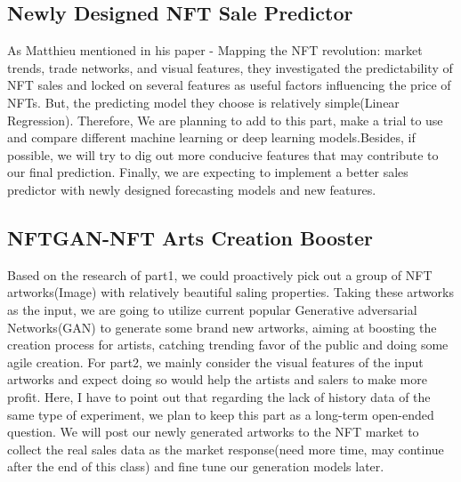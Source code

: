 \subsection{Newly Designed NFT Sale Predictor}
As Matthieu mentioned in his paper - Mapping the NFT revolution: market trends, trade networks, and visual features\cite{nadini2021mapping}, they investigated the predictability of NFT sales and locked on several features as useful factors influencing the price of NFTs. But, the predicting model they choose is relatively simple(Linear Regression). Therefore, We are planning to add to this part, make a trial to use and compare different machine learning or deep learning models.Besides, if possible, we will try to dig out more conducive features that may contribute to our final prediction. Finally, we are expecting to implement a better sales predictor with newly designed forecasting models and new features.

\subsection{NFTGAN-NFT Arts Creation Booster}
Based on the research of part1, we could proactively pick out a group of NFT artworks(Image) with relatively beautiful saling properties. Taking these artworks as the input, we are going to utilize current popular Generative adversarial Networks(GAN) to generate some brand new artworks, aiming at boosting the creation process for artists, catching trending favor of the public and doing some agile creation. For part2, we mainly consider the visual features of the input artworks and expect doing so would help the artists and salers to make more profit. Here, I have to point out that regarding the lack of history data of the same type of experiment, we plan to keep this part as a long-term open-ended question. We will post our newly generated artworks to the NFT market to collect the real sales data as the market response(need more time, may continue after the end of this class) and fine tune our generation models later.





